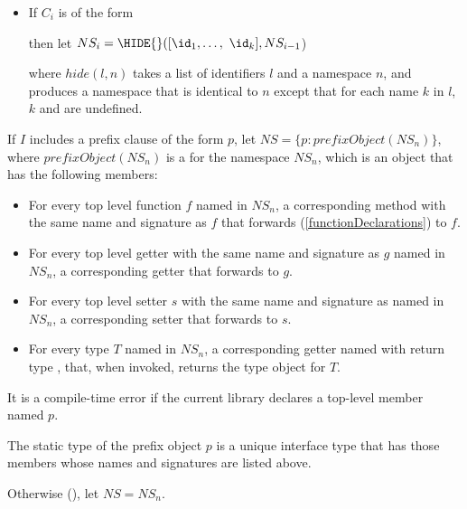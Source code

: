\documentclass[makeidx]{article}
\begin{document}
{\begin{itemize}
\item If $C_i$ is of the form


then let $NS_i = \HIDE{}([\id_1, \ldots,\ \id_k], NS_{i-1}$)

where $hide(l, n)$ takes a list of identifiers $l$ and a namespace $n$, and produces a namespace that is identical to $n$ except that for each name $k$ in $l$, $k$ and  are undefined.
\end{itemize}

\LMHash{}%
If $I$ includes a prefix clause of the form \AS{} $p$,
let $NS = \{p: prefixObject(NS_n)\}$,
where $prefixObject(NS_n)$ is a  for the namespace $NS_n$,
which is an object that has the following members:

\begin{itemize}
\item For every top level function $f$ named \id{} in $NS_n$, a corresponding method with the same name and signature as $f$ that forwards (\ref{functionDeclarations}) to $f$.
\item For every top level getter with the same name and signature as $g$ named \id{} in $NS_n$, a corresponding getter that forwards to $g$.
\item For every top level setter $s$ with the same name and signature as named \id{} in $NS_n$, a corresponding setter that forwards to $s$.
\item For every type $T$ named \id{} in $NS_n$, a corresponding getter named \id{} with return type , that, when invoked, returns the type object for $T$.
\end{itemize}

\LMHash{}%
It is a compile-time error if the current library declares a top-level member named $p$.

The static type of the prefix object $p$ is a unique interface type that has those members whose names and signatures are listed above.


\LMHash{}%
Otherwise (), let $NS = NS_n$.

}
\end{document}
